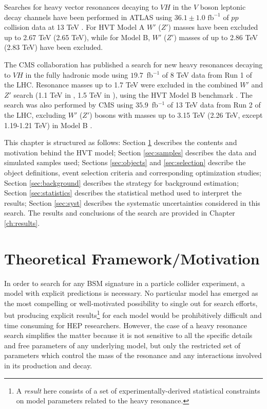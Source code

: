 Searches for heavy vector resonances decaying to $VH$ in the $V$ boson leptonic decay channels have been performed in ATLAS using $36.1\pm1.0\text{~fb}^{-1}$ of $pp$ collision data at 13 TeV \cite{EXOT-2016-10}.
For HVT Model A $W'$ ($Z'$) masses have been excluded up to 2.67 TeV (2.65 TeV), while for Model B, $W'$ ($Z'$) masses of up to 2.86 TeV (2.83 TeV) have been excluded.

The CMS collaboration has published a search for new heavy resonances decaying to $VH$ in the fully hadronic mode using $19.7$~fb$^{-1}$ of 8 TeV data from Run 1 of the LHC.
Resonance masses up to 1.7 TeV were excluded in the combined $W'$ and $Z'$ search (1.1 TeV in \zpzh, 1.5 TeV in \wpwh), using the HVT Model B benchmark \cite{Khachatryan:2015bma}.
The search was also performed by CMS using $35.9$~fb$^{-1}$ of 13 TeV data from Run 2 of the LHC, excluding $W'$ ($Z'$) bosons with masses up to 3.15 TeV (2.26 TeV, except 1.19-1.21 TeV) in Model B \cite{Sirunyan:2017wto}.

This chapter is structured as follows: Section \ref{sec:theory_overview} describes the contents and motivation behind the HVT model; Section \ref{sec:samples} describes the data and simulated samples used; Sections \ref{sec:objects} and \ref{sec:selection} describe the object definitions, event selection criteria and corresponding optimization studies; Section \ref{sec:background} describes the strategy for background estimation; Section \ref{sec:statistics} describes the statistical method used to interpret the results; Section \ref{sec:syst} describes the systematic uncertainties considered in this search.
The results and conclusions of the search are provided in Chapter \ref{ch:results}.

\section{Theoretical Framework/Motivation}
\label{sec:theory_overview}

In order to search for any BSM signature in a particle collider experiment, a model with explicit predictions is necessary.
No particular model has emerged as the most compelling or well-motivated possibility to single out for search efforts, but producing explicit results\footnote{A \textit{result} here consists of a set of experimentally-derived statistical constraints on model parameters related to the heavy resonance.} for each model would be prohibitively difficult and time consuming for HEP researchers.
However, the case of a heavy resonance search simplifies the matter because it is not sensitive to all the specific details and free parameters of any underlying model, but only the restricted set of parameters which control the mass of the resonance and any interactions involved in its production and decay.

